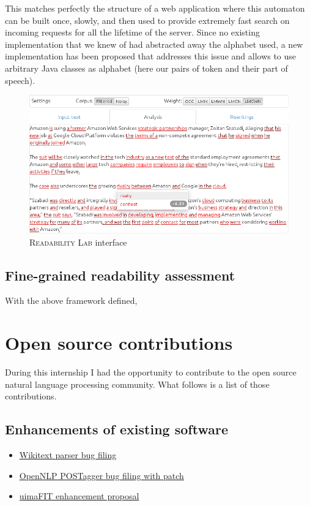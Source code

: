 \documentclass[a4paper, 11pt, onepage]{scrreprt}
\begin{document}
This matches perfectly the structure of a web application where this
automaton can be built once, slowly, and then used to provide
extremely fast search on incoming requests for all the lifetime of the
server. Since no existing implementation that we knew of had
abstracted away the alphabet used, a new implementation has been
proposed that addresses this issue and allows to use arbitrary Java
classes as alphabet (here our pairs of token and their part of
speech).

\begin{figure}[H]
  \centering
  \includegraphics[width=\textwidth]{ui}
  \caption{\textsc{Readability Lab} interface}
  \label{fig:ui}
\end{figure}

\section{Fine-grained readability assessment}
\label{sec:fine-grain-read}

With the above framework defined, 

\chapter{Open source contributions}
\label{cha:oss-contribs}

During this internship I had the opportunity to contribute to the open
source natural language processing community. What follows is a list
of those contributions.

\section{Enhancements of existing software}
\label{sec:enhancements}

\begin{itemize}
\item
  \href{https://bugs.eclipse.org/bugs/show_bug.cgi?id=433163}{Wikitext
    parser bug filing}
\item \href{https://issues.apache.org/jira/browse/OPENNLP-676}{OpenNLP
    POSTagger bug filing with patch}
\item \href{https://issues.apache.org/jira/browse/UIMA-3913}{uimaFIT
    enhancement proposal}
\end{itemize}
\end{document}
